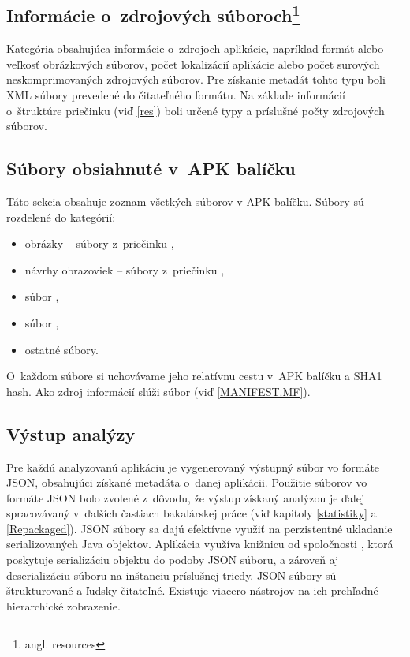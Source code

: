\subsection*{Informácie o~zdrojových súboroch\footnote{angl. resources}} 
Kategória obsahujúca informácie o~zdrojoch aplikácie, napríklad formát alebo veľkosť obrázkových súborov, počet lokalizácií aplikácie alebo počet surových neskomprimovaných zdrojových súborov. Pre získanie metadát tohto typu boli XML súbory prevedené do čitateľného formátu. Na základe informácií o~štruktúre priečinku  (viď \ref{res}) boli určené typy a príslušné počty zdrojových súborov.
\subsection*{Súbory obsiahnuté v~APK balíčku}
Táto sekcia obsahuje zoznam všetkých súborov v APK balíčku. Súbory sú rozdelené do kategórií: 
\begin{itemize}
\item obrázky -- súbory z~priečinku ,
\item návrhy obrazoviek -- súbory z~priečinku , 
\item súbor , 
\item súbor ,
\item ostatné súbory.
\end{itemize}
O~každom súbore si uchovávame jeho relatívnu cestu v~APK balíčku a SHA1 hash. Ako zdroj informácií slúži súbor  (viď \ref{MANIFEST.MF}).


\subsection{Výstup analýzy}
Pre každú analyzovanú aplikáciu je vygenerovaný výstupný súbor vo formáte JSON, obsahujúci získané metadáta o~danej aplikácii. Použitie súborov vo formáte JSON bolo zvolené z~dôvodu, že výstup získaný analýzou je ďalej spracovávaný v~ďalších častiach bakalárskej práce (viď kapitoly \ref{statistiky} a \ref{Repackaged}). JSON súbory sa dajú efektívne využiť na perzistentné ukladanie serializovaných Java objektov. Aplikácia  využíva knižnicu  od spoločnosti , ktorá poskytuje serializáciu objektu do podoby JSON súboru, a zároveň aj deserializáciu súboru na inštanciu príslušnej triedy. JSON súbory sú štrukturované a ľudsky čitateľné. Existuje viacero nástrojov na ich prehľadné hierarchické zobrazenie.  
